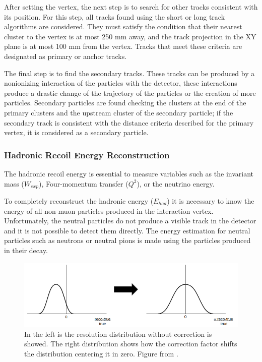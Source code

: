 After setting the vertex, the next step is to search for other tracks consistent with its position. For this step, all tracks found using the short or long track algorithms are considered. They must satisfy the condition that their nearest cluster to the vertex is at most 250 mm away, and the track projection in the XY plane is at most 100 mm from the vertex. Tracks that meet these criteria are designated as primary or anchor tracks.  

The final step is to find the secondary tracks. These tracks can be produced by a nonionizing interaction of the particles with the detector, these interactions produce a drastic change of the trajectory of the particles or the creation of more particles. Secondary particles are found checking the clusters at the end of the primary clusters and the upstream cluster of the secondary particle; if the secondary track is consistent with the distance criteria described for the primary vertex, it is considered as a secondary particle. 


\subsubsection{Hadronic Recoil Energy Reconstruction}
\label{Cap:MnvExp:MnvDetector:DataReconstruction:ENergyReconstruction}

The hadronic recoil energy is essential to measure variables such as the invariant mass ($W_{exp}$), Four-momentum transfer ($Q^2$), or the neutrino energy.

To completely reconstruct the hadronic energy ($E_{had}$) it is necessary to know the energy of all non-muon particles produced in the interaction vertex. Unfortunately, the neutral particles do not produce a visible track in the detector and it is not possible to detect them directly. The energy estimation for neutral particles such as neutrons or neutral pions is made using the particles produced in their decay. 

\begin{figure}[!htb]
    \centering
    \includegraphics[scale=0.5]{Figures/Chapter2/CorrectionFactor.png}
    \caption{In the left is the resolution distribution without correction is showed. The right distribution shows how the correction factor shifts the distribution centering it in zero. Figure from \cite{AaronThesis}.}
    \label{fig:MnvExp:MnvDetector:DataReconstruction:EnergyRes}
\end{figure}

